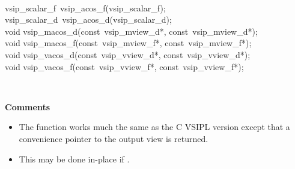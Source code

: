 \\\cvsiplh
\begin{cfuncs}
vsip\_scalar\_f~vsip\_acos\_f(vsip\_scalar\_f);\\
vsip\_scalar\_d~vsip\_acos\_d(vsip\_scalar\_d);\\
void vsip\_macos\_d(const~vsip\_mview\_d*, const~vsip\_mview\_d*);\\
void vsip\_macos\_f(const~vsip\_mview\_f*, const~vsip\_mview\_f*);\\
void vsip\_vacos\_d(const~vsip\_vview\_d*, const~vsip\_vview\_d*);\\
void vsip\_vacos\_f(const~vsip\_vview\_f*, const~vsip\_vview\_f*);\\
\end{cfuncs}
\pyjvsiph
{}
\\\begin{minipage}{\textwidth}
\hspace*{.04\textwidth}\textbf{Comments}\\ 
\hspace*{.04\textwidth}\parbox{.95\textwidth}
{\vspace*{.1cm}
\begin{itemize}
\item{The  function works much the same as the C VSIPL version except that a convenience pointer to the output view is returned.}
\item{This may be done in-place if .}
\end{itemize}
}
\end{minipage}